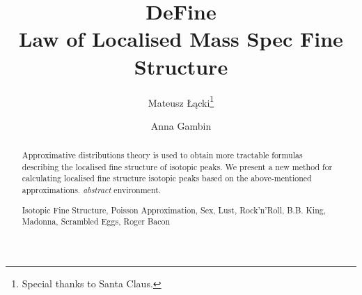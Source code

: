 \documentclass[runningheads,a4paper]{llncs}
\newcommand{\keywords}[1]{\par\addvspace\baselineskip
\noindent\keywordname\enspace\ignorespaces#1}
\begin{document}
\mainmatter  

\title{DeFine\\Law of Localised Mass Spec Fine Structure}


\author{Mateusz \L\k{a}cki\thanks{Special thanks to Santa Claus.}
\and Anna Gambin}





\maketitle

\begin{abstract}
  Approximative distributions theory is used to obtain more tractable formulas describing the localised fine structure of isotopic peaks.  
  We present a new method for calculating localised fine structure isotopic peaks based on the above-mentioned approximations. 
\emph{abstract} environment.
\keywords{Isotopic Fine Structure, Poisson Approximation, Sex, Lust, Rock'n'Roll, B.B. King, Madonna, Scrambled Eggs, Roger Bacon }
\end{abstract}









  
  



\end{document}
